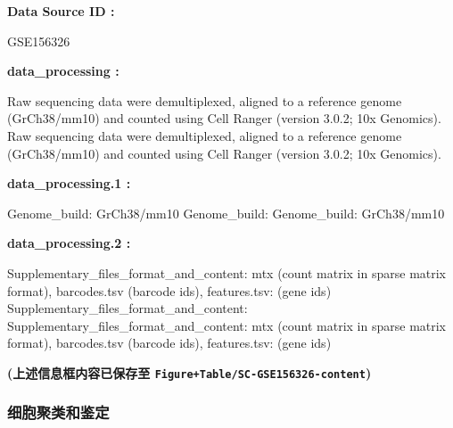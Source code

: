 \documentclass[
]{article}
\begin{document}
\begin{center}\begin{tcolorbox}[colback=gray!10, colframe=gray!50, width=0.9\linewidth, arc=1mm, boxrule=0.5pt]
\textbf{
Data Source ID
:}

\vspace{0.5em}

    GSE156326

\vspace{2em}


\textbf{
data\_processing
:}

\vspace{0.5em}

    Raw sequencing data were demultiplexed, aligned to a
reference genome (GrCh38/mm10) and counted using Cell
Ranger (version 3.0.2; 10x Genomics).
    Raw sequencing data were demultiplexed, aligned to a
reference genome (GrCh38/mm10) and counted using Cell
Ranger (version 3.0.2; 10x Genomics).

\vspace{2em}


\textbf{
data\_processing.1
:}

\vspace{0.5em}

    Genome\_build: GrCh38/mm10
    Genome\_build: Genome\_build: GrCh38/mm10

\vspace{2em}


\textbf{
data\_processing.2
:}

\vspace{0.5em}

    Supplementary\_files\_format\_and\_content: mtx (count
matrix in sparse matrix format), barcodes.tsv (barcode
ids), features.tsv: (gene ids)
    Supplementary\_files\_format\_and\_content:
Supplementary\_files\_format\_and\_content: mtx (count matrix
in sparse matrix format), barcodes.tsv (barcode ids),
features.tsv: (gene ids)

\vspace{2em}
\end{tcolorbox}
\end{center}

\textbf{(上述信息框内容已保存至 \texttt{Figure+Table/SC-GSE156326-content})}

\hypertarget{ux7ec6ux80deux805aux7c7bux548cux9274ux5b9a}{%
\subsubsection{细胞聚类和鉴定}\label{ux7ec6ux80deux805aux7c7bux548cux9274ux5b9a}}
\end{document}
